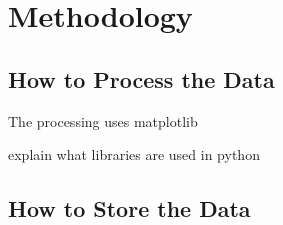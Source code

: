\chapter{Methodology}\label{ch:methodology} %
\section{How to Process the Data} %
\label{sec:how_to_process_the_data}
The processing uses matplotlib\cite{Hunter:2007}


explain what libraries are used in python

\section{How to Store the Data} %
\label{sec:how_to_store_the_data}

